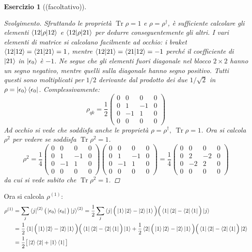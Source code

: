 \documentclass[11pt, a4paper]{scrartcl} %
\numberwithin{equation}{subsection}
\theoremstyle{style2}
\theoremstyle{style1}
\newtheorem{esercizio}{Esercizio}[section]
\renewcommand\qedsymbol{$\blacksquare$}
\newenvironment{svolgimento}{\renewcommand\qedsymbol{$\spadesuit$}\begin{proof}[Svolgimento]}{\end{proof}}
\newenvironment{boxenv}[1][]{
    \begin{eqbox}[#1]
    }{
   \end{eqbox}
}
\begin{document}
\begin{boxenv}[]
\begin{esercizio}[(facoltativo)]
\begin{svolgimento}
Sfruttando le propriet\`a $\operatorname{Tr} \rho  = 1$ e $\rho = \rho ^\dagger $, \`e sufficiente calcolare gli elementi $\braket{12|\rho |12} $ e $\braket{12|\rho |21} $ per dedurre conseguentemente gli altri.
I vari elementi di matrice si calcolano facilmente ad occhio: i braket $\braket{12|12} = \braket{21|21} =1$, mentre $\braket{12|21} = \braket{21|12} =-1$ perch\'e il coefficiente di $\ket{21} $ in $\ket{\epsilon _0} $ \`e $-1$. 
Ne segue che gli elementi fuori diagonale nel blocco $2\times 2$ hanno un segno negativo, mentre quelli sulla diagonale hanno segno positivo. 
Tutti questi sono moltiplicati per $1 / 2$ derivante dal prodotto dei due $1 / \sqrt{2} $ in $\rho  = \ket{\epsilon _0} \bra{\epsilon _0} $. 
Complessivamente:
\begin{equation}
	\rho _{qk} = \frac{1}{2} \begin{pmatrix} 0 & 0&0&0\\ 0& 1 & -1 & 0\\ 0&-1&1&0 \\ 0&0&0&0 \end{pmatrix} 
\end{equation}
Ad occhio si vede che soddisfa anche le propriet\`a $\rho = \rho^\dagger , \ \operatorname{Tr} \rho  = 1$.
Ora si calcola $\rho ^2 $ per vedere se soddisfa $\operatorname{Tr} \rho ^2 = 1$.
\[
	\rho ^2 = \frac{1}{4}  \begin{pmatrix} 0 & 0&0&0\\ 0& 1 & -1 & 0\\ 0&-1&1&0 \\ 0&0&0&0 \end{pmatrix}\begin{pmatrix} 0 & 0&0&0\\ 0& 1 & -1 & 0\\ 0&-1&1&0 \\ 0&0&0&0 \end{pmatrix} = \frac{1}{4} \begin{pmatrix} 0 & 0 & 0& 0\\ 0& 2 & -2 &0\\ 0& -2 & 2 &0\\ 0& 0& 0&0 \end{pmatrix} 
\] 
da cui si vede subito che $\operatorname{Tr} \rho ^2 = 1$.
\end{svolgimento}
\end{esercizio}
\end{boxenv}
Ora si calcola $\rho ^{(1)} $:
\[
	\begin{split}
		\rho ^{(1)} &= \sum_{j}^{} \bra{j}^{(2)}  \big (\ket{\epsilon _0} \bra{\epsilon _0}\big)  \ket{j}  ^{(2)} = \frac{1}{2}\sum_{j}^{} \bra{j}\Big(\ket{1} \ket{2} - \ket{2} \ket{1} \Big)\Big(\bra{1} \bra{2} -\bra{2} \bra{1} \Big) \ket{j} \\
			    &= \frac{1}{2} \bra{1} \Big(\ket{1} \ket{2} - \ket{2} \ket{1} \Big)\Big(\bra{1} \bra{2} -\bra{2} \bra{1} \Big) \ket{1}  + \frac{1}{2} \bra{2} \Big(\ket{1} \ket{2} - \ket{2} \ket{1} \Big)\Big(\bra{1} \bra{2} -\bra{2} \bra{1} \Big)\ket{2} \\
			    &= \frac{1}{2} \big[ \ket{2} \bra{2} + \ket{1} \bra{1} \big]
	\end{split}
\] 
\end{document}

